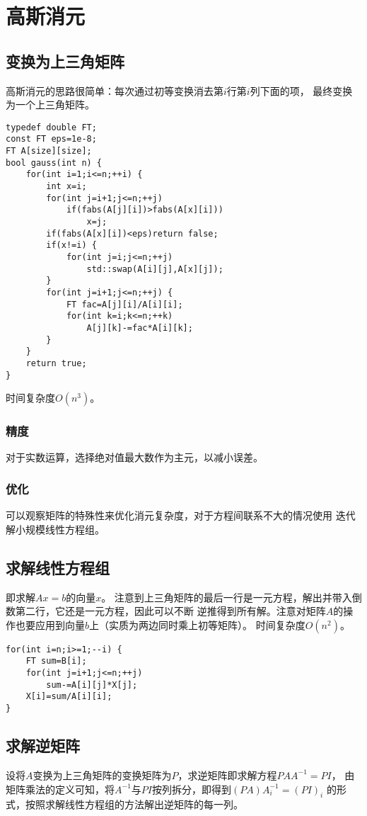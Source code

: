\section{高斯消元}
\subsection{变换为上三角矩阵}
高斯消元的思路很简单：每次通过初等变换消去第$i$行第$i$列下面的项，
最终变换为一个上三角矩阵。
\begin{lstlisting}[title=gauss]
typedef double FT;
const FT eps=1e-8;
FT A[size][size];
bool gauss(int n) {
    for(int i=1;i<=n;++i) {
        int x=i;
        for(int j=i+1;j<=n;++j)
            if(fabs(A[j][i])>fabs(A[x][i]))
                x=j;
        if(fabs(A[x][i])<eps)return false;
        if(x!=i) {
            for(int j=i;j<=n;++j)
                std::swap(A[i][j],A[x][j]);
        }
        for(int j=i+1;j<=n;++j) {
            FT fac=A[j][i]/A[i][i];
            for(int k=i;k<=n;++k)
                A[j][k]-=fac*A[i][k];
        }
    }
    return true;
}
\end{lstlisting}
时间复杂度$O(n^3)$。
\subsubsection{精度}
对于实数运算，选择绝对值最大数作为主元，以减小误差。
\subsubsection{优化}
可以观察矩阵的特殊性来优化消元复杂度，对于方程间联系不大的情况使用
迭代解小规模线性方程组。
\subsection{求解线性方程组}\label{LSE}
即求解$Ax=b$的向量$x$。
注意到上三角矩阵的最后一行是一元方程，解出并带入倒数第二行，它还是一元方程，因此可以不断
逆推得到所有解。注意对矩阵$A$的操作也要应用到向量$b$上（实质为两边同时乘上初等矩阵）。
时间复杂度$O(n^2)$。
\begin{lstlisting}
for(int i=n;i>=1;--i) {
    FT sum=B[i];
    for(int j=i+1;j<=n;++j)
        sum-=A[i][j]*X[j];
    X[i]=sum/A[i][i];
}
\end{lstlisting}
\subsection{求解逆矩阵}\label{InvMatGauss}
设将$A$变换为上三角矩阵的变换矩阵为$P$，求逆矩阵即求解方程$PAA^{-1}=PI$，
由矩阵乘法的定义可知，将$A^{-1}$与$PI$按列拆分，即得到$(PA)A_i^{-1}=(PI)_i$
的形式，按照求解线性方程组的方法解出逆矩阵的每一列。

